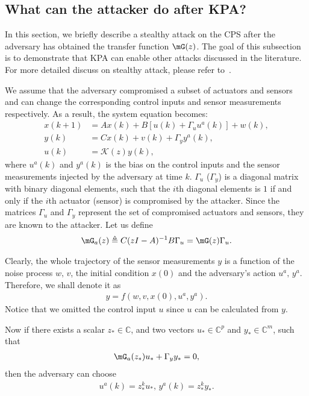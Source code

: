   \subsection{What can the attacker do after KPA?}
  \label{sec:stealthy}
  In this section, we briefly describe a stealthy attack on the CPS after the adversary has obtained the transfer function $\mG(z)$. The goal of this subsection is to demonstrate that KPA can enable other attacks discussed in the literature. For more detailed discuss on stealthy attack, please refer to~\cite{Pasqualetti2013}. 

  We assume that the adversary compromised a subset of actuators and sensors and can change the corresponding control inputs and sensor measurements respectively. As a result, the system equation becomes:
  \begin{align*}
    x(k+1) &= Ax(k) + B\left[u(k) + \Gamma_u u^a(k)\right]+w(k),\\
    y(k) &= Cx(k) + v(k) + \Gamma_y y^a(k),\\
    u(k) &= \mathcal K(z)y(k),
  \end{align*}
  where $u^a(k)$ and $y^a(k)$ is the bias on the control inputs and the sensor measurements injected by the adversary at time $k$. $\Gamma_u$ ($\Gamma_y$) is a diagonal matrix with binary diagonal elements, such that the $i$th diagonal elements is $1$ if and only if the $i$th actuator (sensor) is compromised by the attacker. Since the matrices $\Gamma_u$ and $\Gamma_y$ represent the set of compromised actuators and sensors, they are known to the attacker. Let us define
  \begin{align*}
    \mG_a(z) \triangleq C(zI-A)^{-1}B\Gamma_u = \mG(z)\Gamma_u. 
  \end{align*}

  Clearly, the whole trajectory of the sensor measurements $y$ is a function of the noise process $w,\,v$, the initial condition $x(0)$ and the adversary's action $u^a,\,y^a$. Therefore, we shall denote it as 
  \begin{align*}
    y = f(w,v,x(0),u^a,y^a). 
  \end{align*}
  Notice that we omitted the control input $u$ since $u$ can be calculated from $y$.

  Now if there exists a scalar $z_*\in \mathbb C$, and two vectors $u_*\in \mathbb C^p$ and $y_*\in \mathbb C^m$, such that
  \begin{align*}
    \mG_a(z_*)u_* + \Gamma_y y_* = 0,
  \end{align*}
  then the adversary can choose
  \begin{align}
    u^a(k) = z_*^k u_*,\,y^a(k) = z_*^k y_*.
    \label{eq:stealthyinput}
  \end{align}

